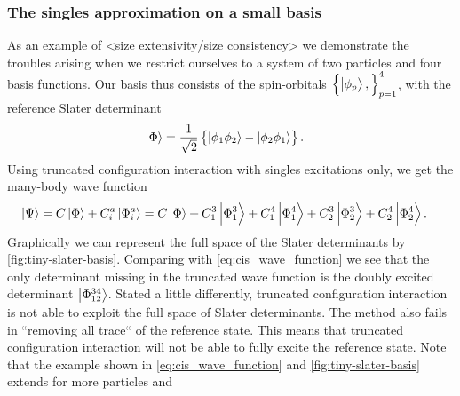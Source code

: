             \subsubsection{The singles approximation on a small basis}
                As an example of <size extensivity/size consistency> we demonstrate
                the troubles arising when we restrict ourselves to a system of two
                particles and four basis functions.
                Our basis thus consists of the spin-orbitals $\left\{ \ket{\phi_p},
                 \right\}_{p = 1}^{4}$, with the reference Slater determinant
                \begin{align}
                    \ket{\Phi}
                    &= \frac{1}{\sqrt{2}}\left\{ 
                        \ket{\phi_1\phi_2}
                        - \ket{\phi_2\phi_1}
                     \right\}.
                \end{align}
                Using truncated configuration interaction with singles excitations
                only, we get the many-body wave function
                \begin{align}
                    \ket{\Psi}
                    &= C\ket{\Phi}
                    + C^{a}_{i}\ket{\Phi^{a}_{i}}
                    = C\ket{\Phi}
                    + C^{3}_{1}\ket{\Phi^{3}_{1}}
                    + C^{4}_{1}\ket{\Phi^{4}_{1}}
                    + C^{3}_{2}\ket{\Phi^{3}_{2}}
                    + C^{4}_{2}\ket{\Phi^{4}_{2}}.
                    \label{eq:cis_wave_function}
                \end{align}
                Graphically we can represent the full space of the Slater determinants
                by \autoref{fig:tiny-slater-basis}.
                Comparing with \autoref{eq:cis_wave_function} we see that the only
                determinant missing in the truncated wave function is the doubly
                excited determinant $\ket{\Phi^{34}_{12}}$.
                Stated a little differently, truncated configuration interaction is
                not able to exploit the full space of Slater determinants.
                The method also fails in ``removing all trace`` of the reference
                state.
                This means that truncated configuration interaction will not be able
                to fully excite the reference state.
                Note that the example shown in \autoref{eq:cis_wave_function} and
                \autoref{fig:tiny-slater-basis} extends for more particles and
